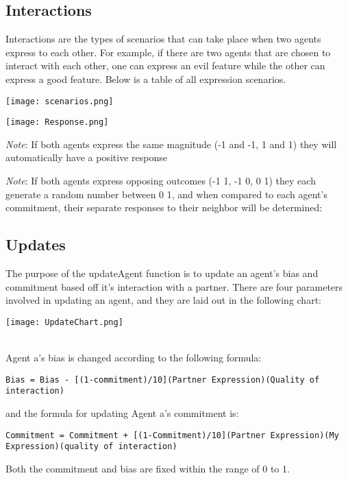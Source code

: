 \documentclass[]{article}
\begin{document}
\subsection{Interactions}
Interactions are the types of scenarios that can take place when two agents express to each other. For example, if there are two agents that are chosen to interact with each other, one can express an evil feature while the other can express a good feature. Below is a table of all expression scenarios.

\centerline{\texttt{[image: scenarios.png]}}
\centerline{\texttt{[image: Response.png]}}

	
\textit{Note}: If both agents express the same magnitude (-1 and -1, 1 and 1) they will automatically have a positive response

\textit{Note}: If both agents express opposing outcomes (-1 1, -1 0, 0 1) they each generate a random number between 0 1, and when compared to each agent's commitment, their separate responses to their neighbor will be determined:


\subsection{Updates}


The purpose of the updateAgent function is to update an agent's bias and commitment based off it's interaction with a partner. There are four parameters involved in updating an agent, and they are laid out in the following chart: 
\\
\centerline{\texttt{[image: UpdateChart.png]}}
\\


Agent a's bias is changed according to the following formula:
\begin{lstlisting}
Bias = Bias - [(1-commitment)/10](Partner Expression)(Quality of interaction)
\end{lstlisting}
and the formula for updating Agent a's commitment is:
\begin{lstlisting}
Commitment = Commitment + [(1-Commitment)/10](Partner Expression)(My Expression)(quality of interaction)
\end{lstlisting}
Both the commitment and bias are fixed within the range of 0 to 1.
\end{document}

